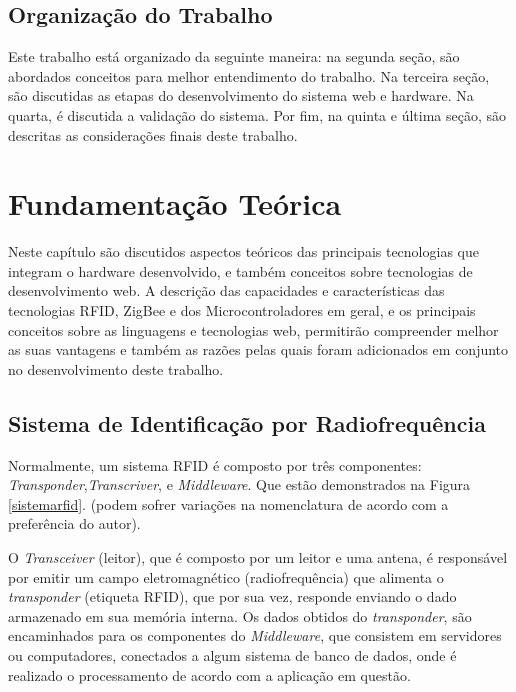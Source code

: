 \documentclass[tcc,capa]{texufpel}
\begin{document}
    
    \section{Organização do Trabalho}
    
        Este trabalho está organizado da seguinte maneira: na segunda seção, são abordados conceitos para melhor entendimento do trabalho. 
        Na terceira seção, são discutidas as etapas do desenvolvimento do sistema web e hardware. Na quarta, é discutida a validação do sistema. Por fim, na quinta e última seção, são descritas as considerações finais deste trabalho.


\chapter{Fundamentação Teórica}

    Neste capítulo são discutidos aspectos teóricos das principais tecnologias que integram o hardware desenvolvido, e também conceitos sobre tecnologias de desenvolvimento web. A descrição das capacidades e características das tecnologias RFID, ZigBee e dos Microcontroladores em geral, e os principais conceitos sobre as linguagens e tecnologias web, permitirão compreender melhor as suas vantagens e também as razões pelas quais foram adicionados em conjunto no desenvolvimento deste trabalho.


    \section{Sistema de Identificação por Radiofrequência}
    
        Normalmente, um sistema RFID é composto por três componentes: \textit{Transponder},\textit{Transcriver}, e \textit{Middleware}. Que estão demonstrados na Figura \ref{sistemarfid}. (podem sofrer variações na nomenclatura de acordo com a preferência do autor).
        
        O \textit{Transceiver} (leitor), que é composto por um leitor e uma antena, é responsável por emitir um campo eletromagnético (radiofrequência) que alimenta o \textit{transponder} (etiqueta RFID), que por sua vez, responde enviando o dado armazenado em sua memória interna. Os dados obtidos do \textit{transponder}, são encaminhados para os componentes do \textit{Middleware}, que consistem em servidores ou computadores, conectados a algum sistema de banco de dados, onde é realizado o processamento de acordo com a aplicação em questão. 
    
\end{document}
